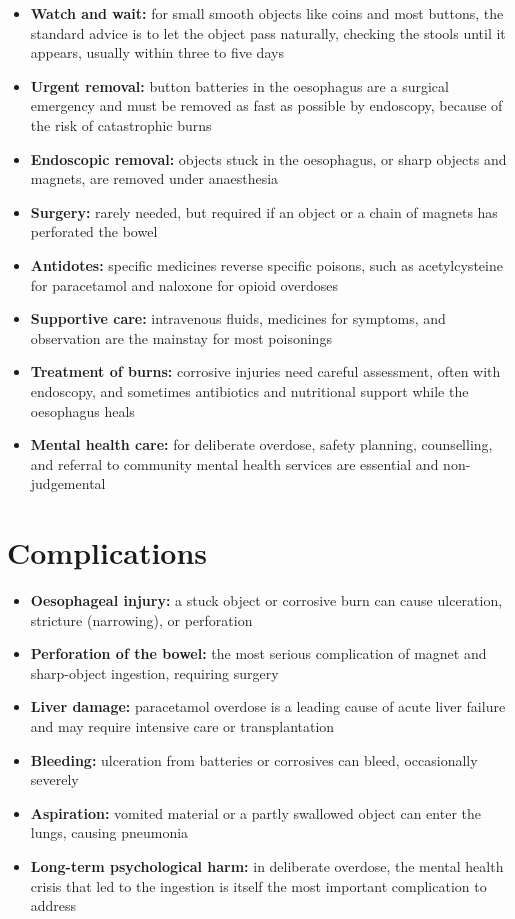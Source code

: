 \begin{itemize}
    \item \textbf{Watch and wait:} for small smooth objects like coins and most buttons, the standard advice is to let the object pass naturally, checking the stools until it appears, usually within three to five days
    \item \textbf{Urgent removal:} button batteries in the oesophagus are a surgical emergency and must be removed as fast as possible by endoscopy, because of the risk of catastrophic burns
    \item \textbf{Endoscopic removal:} objects stuck in the oesophagus, or sharp objects and magnets, are removed under anaesthesia
    \item \textbf{Surgery:} rarely needed, but required if an object or a chain of magnets has perforated the bowel
    \item \textbf{Antidotes:} specific medicines reverse specific poisons, such as acetylcysteine for paracetamol and naloxone for opioid overdoses
    \item \textbf{Supportive care:} intravenous fluids, medicines for symptoms, and observation are the mainstay for most poisonings
    \item \textbf{Treatment of burns:} corrosive injuries need careful assessment, often with endoscopy, and sometimes antibiotics and nutritional support while the oesophagus heals
    \item \textbf{Mental health care:} for deliberate overdose, safety planning, counselling, and referral to community mental health services are essential and non-judgemental
\end{itemize}

\section*{Complications}
\begin{itemize}
    \item \textbf{Oesophageal injury:} a stuck object or corrosive burn can cause ulceration, stricture (narrowing), or perforation
    \item \textbf{Perforation of the bowel:} the most serious complication of magnet and sharp-object ingestion, requiring surgery
    \item \textbf{Liver damage:} paracetamol overdose is a leading cause of acute liver failure and may require intensive care or transplantation
    \item \textbf{Bleeding:} ulceration from batteries or corrosives can bleed, occasionally severely
    \item \textbf{Aspiration:} vomited material or a partly swallowed object can enter the lungs, causing pneumonia
    \item \textbf{Long-term psychological harm:} in deliberate overdose, the mental health crisis that led to the ingestion is itself the most important complication to address
\end{itemize}

